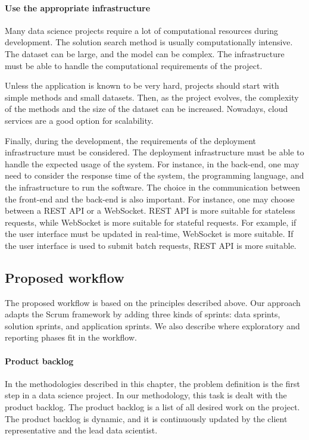 \paragraph{Use the appropriate infrastructure}

Many data science projects require a lot of computational resources during development.
The solution search method is usually computationally intensive.  The dataset can be
large, and the model can be complex.  The infrastructure must be able to handle the
computational requirements of the project.

Unless the application is known to be very hard, projects should start with simple methods
and small datasets.  Then, as the project evolves, the complexity of the methods and the
size of the dataset can be increased.  Nowadays, cloud services are a good option for
scalability.

Finally, during the development, the requirements of the deployment infrastructure must be
considered.  The deployment infrastructure must be able to handle the expected usage
of the system.  For instance, in the back-end, one may need to consider the response time
of the system, the programming language, and the infrastructure to run the software.
The choice in the communication between the front-end and the back-end is also important.
For instance, one may choose between a REST API or a WebSocket.  REST API is more suitable
for stateless requests, while WebSocket is more suitable for stateful requests.  For
example, if the user interface must be updated in real-time, WebSocket is more suitable.
If the user interface is used to submit batch requests, REST API is more suitable.

\subsection{Proposed workflow}

The proposed workflow is based on the principles described above.  Our approach adapts
the Scrum framework by adding three kinds of sprints: data sprints, solution sprints, and
application sprints.  We also describe where exploratory and reporting phases fit in the
workflow.

\paragraph{Product backlog}

In the methodologies described in this chapter, the problem definition is the first step
in a data science project.  In our methodology, this task is dealt with the product
backlog.  The product backlog is a list of all desired work on the project. The product
backlog is dynamic, and it is continuously updated by the client representative and the
lead data scientist.

